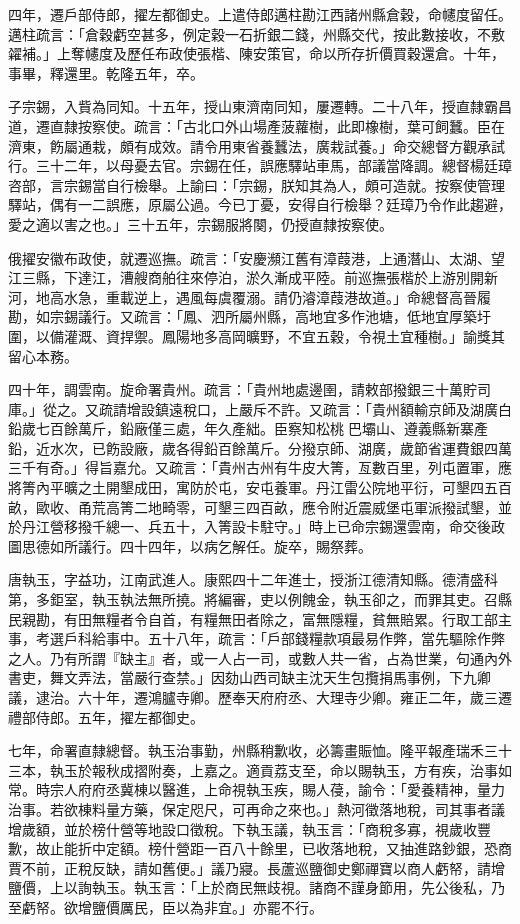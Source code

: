 \begin{pinyinscope}
四年，遷戶部侍郎，擢左都御史。上遣侍郎邁柱勘江西諸州縣倉穀，命幰度留任。邁柱疏言：「倉穀虧空甚多，例定穀一石折銀二錢，州縣交代，按此數接收，不敷糴補。」上奪幰度及歷任布政使張楷、陳安策官，命以所存折價買穀還倉。十年，事畢，釋還里。乾隆五年，卒。

子宗錫，入貲為同知。十五年，授山東濟南同知，屢遷轉。二十八年，授直隸霸昌道，遷直隸按察使。疏言：「古北口外山場產菠蘿樹，此即橡樹，葉可飼蠶。臣在濟東，飭屬通栽，頗有成效。請令用東省養蠶法，廣栽試養。」命交總督方觀承試行。三十二年，以母憂去官。宗錫在任，誤應驛站車馬，部議當降調。總督楊廷璋咨部，言宗錫當自行檢舉。上諭曰：「宗錫，朕知其為人，頗可造就。按察使管理驛站，偶有一二誤應，原屬公過。今已丁憂，安得自行檢舉？廷璋乃令作此趨避，愛之適以害之也。」三十五年，宗錫服將闋，仍授直隸按察使。

俄擢安徽布政使，就遷巡撫。疏言：「安慶瀕江舊有漳葭港，上通潛山、太湖、望江三縣，下達江，漕艘商舶往來停泊，淤久漸成平陸。前巡撫張楷於上游別開新河，地高水急，重載逆上，遇風每虞覆溺。請仍濬漳葭港故道。」命總督高晉履勘，如宗錫議行。又疏言：「鳳、泗所屬州縣，高地宜多作池塘，低地宜厚築圩圍，以備灌溉、資捍禦。鳳陽地多高岡曠野，不宜五穀，令視土宜種樹。」諭獎其留心本務。

四十年，調雲南。旋命署貴州。疏言：「貴州地處邊圉，請敕部撥銀三十萬貯司庫。」從之。又疏請增設鎮遠稅口，上嚴斥不許。又疏言：「貴州額輸京師及湖廣白鉛歲七百餘萬斤，鉛廠僅三處，年久產絀。臣察知松桃巴壩山、遵義縣新寨產鉛，近水次，已飭設廠，歲各得鉛百餘萬斤。分撥京師、湖廣，歲節省運費銀四萬三千有奇。」得旨嘉允。又疏言：「貴州古州有牛皮大箐，亙數百里，列屯置軍，應將箐內平曠之土開墾成田，寓防於屯，安屯養軍。丹江雷公院地平衍，可墾四五百畝，歐收、甬荒高箐二地畸零，可墾三四百畝，應令附近震威堡屯軍派撥試墾，並於丹江營移撥千總一、兵五十，入箐設卡駐守。」時上已命宗錫還雲南，命交後政圖思德如所議行。四十四年，以病乞解任。旋卒，賜祭葬。

唐執玉，字益功，江南武進人。康熙四十二年進士，授浙江德清知縣。德清盛科第，多鉅室，執玉執法無所撓。將編審，吏以例餽金，執玉卻之，而罪其吏。召縣民親勘，有田無糧者令自首，有糧無田者除之，富無隱糧，貧無賠累。行取工部主事，考選戶科給事中。五十八年，疏言：「戶部錢糧款項最易作弊，當先驅除作弊之人。乃有所謂『缺主』者，或一人占一司，或數人共一省，占為世業，句通內外書吏，舞文弄法，當嚴行查禁。」因劾山西司缺主沈天生包攬捐馬事例，下九卿議，逮治。六十年，遷鴻臚寺卿。歷奉天府府丞、大理寺少卿。雍正二年，歲三遷禮部侍郎。五年，擢左都御史。

七年，命署直隸總督。執玉治事勤，州縣稍歉收，必籌畫賑恤。隆平報產瑞禾三十三本，執玉於報秋成摺附奏，上嘉之。適貢荔支至，命以賜執玉，方有疾，治事如常。時宗人府府丞冀棟以醫進，上命視執玉疾，賜人葠，諭令：「愛養精神，量力治事。若欲棟料量方藥，保定咫尺，可再命之來也。」熱河徵落地稅，司其事者議增歲額，並於榜什營等地設口徵稅。下執玉議，執玉言：「商稅多寡，視歲收豐歉，故止能折中定額。榜什營距一百八十餘里，已收落地稅，又抽進路鈔銀，恐商賈不前，正稅反缺，請如舊便。」議乃寢。長蘆巡鹽御史鄭禪寶以商人虧帑，請增鹽價，上以詢執玉。執玉言：「上於商民無歧視。諸商不謹身節用，先公後私，乃至虧帑。欲增鹽價厲民，臣以為非宜。」亦罷不行。


\end{pinyinscope}
